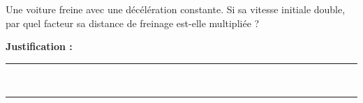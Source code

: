 Une voiture freine avec une décélération constante. Si sa vitesse initiale double, par quel facteur sa distance de freinage est-elle multipliée ?

\choices

\noindent\textbf{Justification :} \hrulefill \\[2.5ex]
\rule{\linewidth}{0.4pt} \\[2.5ex]
\rule{\linewidth}{0.4pt}
\vfill
